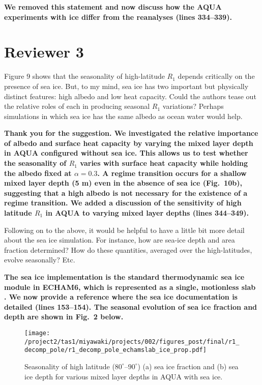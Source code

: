 \documentclass{article}
\begin{document}
\textbf{We removed this statement and now discuss how the AQUA experiments with ice differ from the reanalyses (lines 334--339).}

\section*{Reviewer 3}

Figure 9 shows that the seasonality of high-latitude $R_1$ depends critically on the presence of sea ice. But, to my mind, sea ice has two important but physically distinct features: high albedo and low heat capacity. Could the authors tease out the relative roles of each in producing seasonal $R_1$ variations? Perhaps simulations in which sea ice has the same albedo as ocean water would help.

\textbf{Thank you for the suggestion. We investigated the relative importance of albedo and surface heat capacity by 
varying the mixed layer depth in AQUA configured without sea ice. This allows us to test whether the seasonality of $R_1$ varies with surface heat capacity while holding the albedo fixed at $\alpha=0.3$. A regime transition occurs for a shallow mixed layer depth (5 m) even in the absence of sea ice (Fig.~10b), suggesting that a high albedo is not necessary for the existence of a regime transition. We added a discussion of the sensitivity of high latitude $R_1$ in AQUA to varying mixed layer depths (lines 344--349).}

Following on to the above, it would be helpful to have a little bit more detail about the sea ice simulation. For instance, how are sea-ice depth and area fraction determined? How do these quantities, averaged over the high-latitudes, evolve seasonally? Etc.

\textbf{The sea ice implementation is the standard thermodynamic sea ice module in ECHAM6, which is represented as a single, motionless slab \citep{giorgetta2013}. We now provide a reference where the sea ice documentation is detailed (lines 153--154). The seasonal evolution of sea ice fraction and depth are shown in Fig.~2 below.}

\begin{figure}[!h]
    \centering
    \noindent\texttt{[image: /project2/tas1/miyawaki/projects/002/figures\_post/final/r1\_decomp\_pole/r1\_decomp\_pole\_echamslab\_ice\_prop.pdf]}
    \caption{Seasonality of high latitude ($80^\circ$--$90^\circ$) (a) sea ice fraction and (b) sea ice depth for various mixed layer depths in AQUA with sea ice.}
    \label{fig:echam-sice}
\end{figure}
\end{document}
